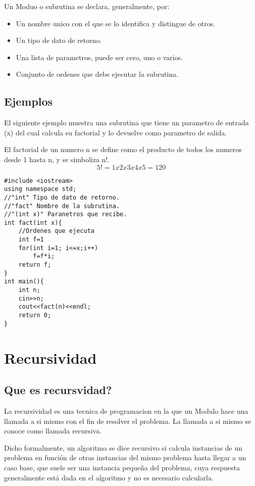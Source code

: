 Un Moduo o subrutina se declara, generalmente, por:
\begin{itemize}
\item Un nombre unico con el que se lo identifica y distingue de otros.
\item Un tipo de dato de retorno.
\item Una lista de parametros, puede ser cero, uno o varios.
\item Conjunto de ordenes que debe ejecutar la subrutina.
\end{itemize}

\subsection{Ejemplos}

El siguiente ejemplo muestra una subrutina que tiene un parametro de entrada (x) del cual calcula su factorial y lo devuelve como parametro de salida.

El factorial de un numero n se define como el producto de todos los numeros desde 1 hasta n, y se simboliza n!. 
\[
5!=1x2x3x4x5=120
\]

\begin{lstlisting}[textcl=true,style=Cpp, label=fact, caption=Factorial]
#include <iostream>  
using namespace std;
//"int" Tipo de dato de retorno.
//"fact" Nombre de la subrutina.
//"(int x)" Paranetros que recibe.
int fact(int x){
	//Ordenes que ejecuta
	int f=1
	for(int i=1; i<=x;i++)
		f=f*i;
	return f;
}
int main(){
	int n;
	cin>>n;
	cout<<fact(n)<<endl;
	return 0;
}
\end{lstlisting}

\section{Recursividad}

\subsection{Que es recursvidad?}

La recursividad es una tecnica de programacion en la que un Modulo hace una llamada a si mismo con el fin de resolver el problema. La llamada a si mismo se conoce como llamada recursiva.

Dicho formalmente, un algoritmo se dice recursivo si calcula instancias de un problema en función de otras instancias del mismo problema hasta llegar a un caso base, que suele ser una instancia pequeña del problema, cuya respuesta generalmente está dada en el algoritmo y no es necesario calcularla.

